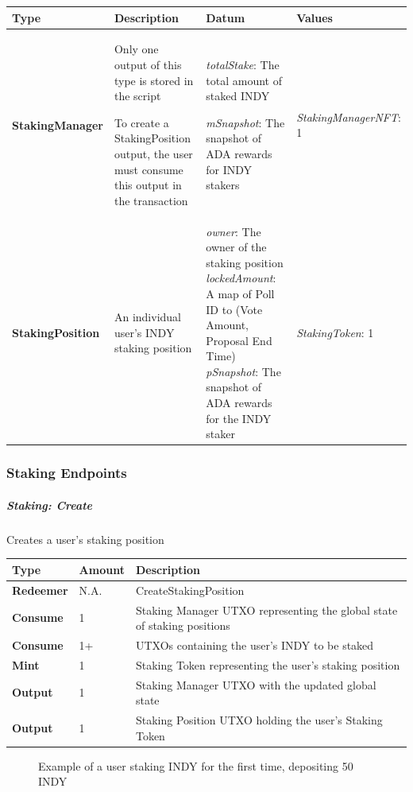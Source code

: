 \documentclass{article}
\begin{document}
\begin{sloppypar}
\begin{tabularx}{\linewidth}{l|L|L|l}
\caption{Staking outputs}
\tabularnewline
\toprule
\textbf{Type} & \textbf{Description} & \textbf{Datum} &
\textbf{Values}
\tabularnewline
\midrule
\endhead
\textbf{StakingManager}
&
Only one output of this type is stored in the script

To create a StakingPosition output, the user must consume this output in
the transaction
&
\emph{totalStake}: The total amount of staked INDY

\emph{mSnapshot}: The snapshot of ADA rewards for INDY stakers
&
\emph{StakingManagerNFT}: 1
\tabularnewline
\midrule
\textbf{StakingPosition} & An individual user's INDY staking position &
\emph{owner}: The owner of the staking position \emph{lockedAmount}: A
map of Poll ID to (Vote Amount, Proposal End Time) \emph{pSnapshot}: The
snapshot of ADA rewards for the INDY staker & \emph{StakingToken}:
1
\tabularnewline
\bottomrule
\end{tabularx}

\hypertarget{staking-endpoints}{%
\subsubsection{Staking Endpoints}\label{staking-endpoints}}

\hypertarget{staking-create}{%
\subparagraph{Staking: Create}\label{staking-create}}

Creates a user's staking position

\begin{tabularx}{\linewidth}{l|l|L}
\toprule
\textbf{Type} & \textbf{Amount} & \textbf{Description}
\tabularnewline
\midrule
\endhead
\textbf{Redeemer} & N.A. & CreateStakingPosition
\tabularnewline
\midrule
\textbf{Consume} & 1 & Staking Manager UTXO representing the global
state of staking positions
\tabularnewline
\midrule
\textbf{Consume} & 1+ & UTXOs containing the user's INDY to be
staked
\tabularnewline
\midrule
\textbf{Mint} & 1 & Staking Token representing the user's staking
position
\tabularnewline
\midrule
\textbf{Output} & 1 & Staking Manager UTXO with the updated global
state
\tabularnewline
\midrule
\textbf{Output} & 1 & Staking Position UTXO holding the user's Staking
Token
\tabularnewline
\bottomrule
\end{tabularx}

\hypertarget{staking-create-figure}{%
\begin{figure}[htbp]
\centering

\caption{Example of a user staking INDY for the first time,
depositing 50 INDY}
\label{staking-create-figure}
\end{figure}}


\end{sloppypar}
\end{document}
